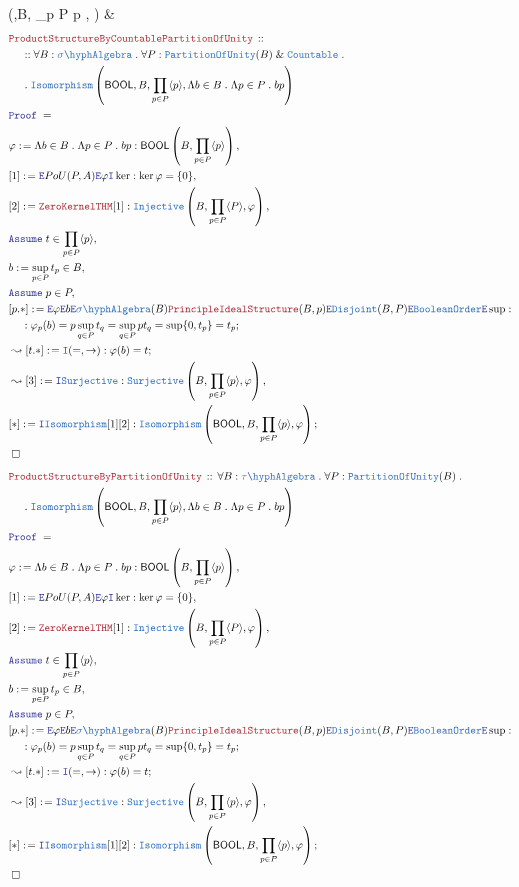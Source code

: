 \documentclass[12pt]{scrartcl}
\newcommand{\TYPE}[1]{\textcolor{NavyBlue}{\mathtt{#1}}}
\newcommand{\LOGIC}[1]{\textcolor{Blue}{\mathtt{#1}}}
\newcommand{\THM}[1]{\textcolor{Maroon}{\mathtt{#1}}}
\renewcommand{\.}{\; . \;}
\newcommand{\de}{: \kern 0.1pc =}
\newcommand{\Theorem}[2]{& \THM{#1} \, :: \, #2 \\ & \Proof = \\ }
\newcommand{\NewLine}{\\ & \kern 1pc}
\newcommand{\Page}[1]{ \begin{align*} #1 \end{align*}   }
\renewcommand{\And}{\; \& \;}
\newcommand{\Intro}{\LOGIC{I}}
\newcommand{\Elim}{\LOGIC{E}}
\newcommand{\Surj}{\TYPE{Surjective}}
\newcommand{\Inj}{\TYPE{Injective}}
\newcommand{\Say}[3]{& #1 \de #2 : #3, \\}
\newcommand{\SayIn}[3]{& #1 \de #2 \in #3, \\}
\newcommand{\Conclude}[3]{& #1 \de #2 : #3; \\}
\newcommand{\Derive}[3]{& \leadsto #1 \de #2 : #3, \\}
\newcommand{\DeriveConclude}[3]{& \leadsto #1 \de #2 : #3 ; \\}
\newcommand{\AssumeIn}[2]{& \LOGIC{Assume} \; #1 \in #2, \\}
\newcommand{\QED}{\; \square}
\newcommand{\EndProof}{& \QED \\}
\newcommand{\Proof}{\LOGIC{Proof} \; }
\newcommand{\SA}{\TYPE{\sigma \hyph Algebra}}
\newcommand{\PoU}{\TYPE{PartitionOfUnity}}
\newcommand{\TAlgebra}{\TYPE{\tau\hyph Algebra}}
\newcommand{\BOOL}{\mathsf{BOOL}}
\begin{document}
{	{\TYPE{Isomorphism}\left(\BOOL,B, \prod_{p \in P} \langle p \rangle, \varphi \right)}
	\EndProof
}\Page{
	\Theorem{ProductStructureByCountablePartitionOfUnity}
	{	
		\NewLine ::		
		\forall B  : \SA \.
		\forall P : \PoU(B) \And \TYPE{Countable} \.
		\NewLine	\.
		\TYPE{Isomorphism}
		\left( 
				\BOOL,
				B,
				\prod_{p \in P}	\langle p \rangle,
				\Lambda b \in B \. \Lambda p \in P \. bp	
		\right)
	}
	\Say{\varphi}{\Lambda b \in B \. \Lambda p \in P \. bp }
	{\BOOL\left( B, \prod_{p \in P} \langle p \rangle \right)}
	\Say{[1]}{\Elim PoU(P,A)\Elim \varphi \Intro \ker}{\ker \varphi = \{0\}}
	\Say{[2]}{\THM{ZeroKernelTHM}[1]}
	{
		\Inj\left( B, \prod_{p \in P} \langle P \rangle , \varphi \right)	
	}
	\AssumeIn{t}{\prod_{p \in P} \langle p \rangle}
	\SayIn{b}{\sup_{p \in P} t_p}{B}
	\AssumeIn{p}{P}
	\Conclude{[p.*]}{
		\Elim \varphi \Elim b
		\Elim \SA(B)
		\THM{PrincipleIdealStructure}(B,p)
		\Elim \TYPE{Disjoint}(B,P)
		\Elim \TYPE{BooleanOrder}
		\Elim \sup	
	}
	{
		\NewLine :		
		\varphi_p(b) =   
		p \sup_{q \in P} t_q = 
		\sup_{q \in P} p t_q = 
		\sup \{ 0, t_p  \} =
		t_p
	}
	\DeriveConclude{[t.*]}{\Intro(=,\to)}{\varphi(b) = t}
	\Derive{[3]}{\Intro \Surj}
	{\Surj\left(B, \prod_{p \in P} \langle p \rangle, \varphi \right)}
	\Conclude{[*]}{\Intro \TYPE{Isomorphism} [1][2]}
	{\TYPE{Isomorphism}\left(\BOOL,B, \prod_{p \in P} \langle p \rangle, \varphi \right)}
	\EndProof
}\Page{
	\Theorem{ProductStructureByPartitionOfUnity}
	{		
		\forall B  : \TAlgebra \.
		\forall P : \PoU(B) \.
		\NewLine	\.
		\TYPE{Isomorphism}
		\left( 
				\BOOL,
				B,
				\prod_{p \in P}	\langle p \rangle,
				\Lambda b \in B \. \Lambda p \in P \. bp	
		\right)
	}
	\Say{\varphi}{\Lambda b \in B \. \Lambda p \in P \. bp }
	{\BOOL\left( B, \prod_{p \in P} \langle p \rangle \right)}
	\Say{[1]}{\Elim PoU(P,A)\Elim \varphi \Intro \ker}{\ker \varphi = \{0\}}
	\Say{[2]}{\THM{ZeroKernelTHM}[1]}
	{
		\Inj\left( B, \prod_{p \in P} \langle P \rangle , \varphi \right)	
	}
	\AssumeIn{t}{\prod_{p \in P} \langle p \rangle}
	\SayIn{b}{\sup_{p \in P} t_p}{B}
	\AssumeIn{p}{P}
	\Conclude{[p.*]}{
		\Elim \varphi \Elim b
		\Elim \SA(B)
		\THM{PrincipleIdealStructure}(B,p)
		\Elim \TYPE{Disjoint}(B,P)
		\Elim \TYPE{BooleanOrder}
		\Elim \sup	
	}
	{
		\NewLine :		
		\varphi_p(b) =   
		p \sup_{q \in P} t_q = 
		\sup_{q \in P} p t_q = 
		\sup \{ 0, t_p  \} =
		t_p
	}
	\DeriveConclude{[t.*]}{\Intro(=,\to)}{\varphi(b) = t}
	\Derive{[3]}{\Intro \Surj}
	{\Surj\left(B, \prod_{p \in P} \langle p \rangle, \varphi \right)}
	\Conclude{[*]}{\Intro \TYPE{Isomorphism} [1][2]}
	{\TYPE{Isomorphism}\left(\BOOL,B, \prod_{p \in P} \langle p \rangle, \varphi \right)}
	\EndProof
}
\newpage
\end{document}
